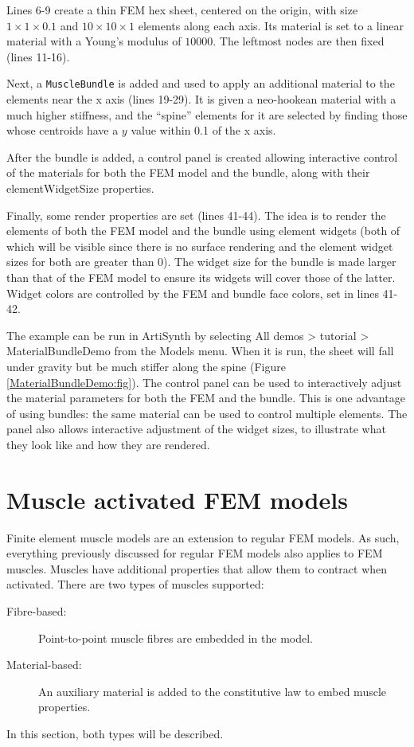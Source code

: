 Lines 6-9 create a thin FEM hex sheet, centered on the origin, with
size $1 \times 1 \times 0.1$ and $10 \times 10 \times 1$ elements
along each axis. Its material is set to a linear material with a
Young's modulus of $10000$. The leftmost nodes are then fixed (lines
11-16).

Next, a {\tt MuscleBundle} is added and used to apply an additional
material to the elements near the x axis (lines 19-29). It is given a
neo-hookean material with a much higher stiffness, and the ``spine''
elements for it are selected by finding those whose centroids 
have a $y$ value within 0.1 of the x axis.

After the bundle is added, a control panel is created allowing
interactive control of the materials for both the FEM model and the
bundle, along with their {\sf elementWidgetSize} properties.

Finally, some render properties are set (lines 41-44). The idea is to
render the elements of both the FEM model and the bundle using element
widgets (both of which will be visible since there is no surface
rendering and the element widget sizes for both are greater than 0).
The widget size for the bundle is made larger than that of the FEM
model to ensure its widgets will cover those of the latter. Widget
colors are controlled by the FEM and bundle face colors, set in lines
41-42.

The example can be run in ArtiSynth by selecting {\sf All demos >
tutorial > MaterialBundleDemo} from the {\sf Models} menu.  When it is
run, the sheet will fall under gravity but be much stiffer along the
spine (Figure \ref{MaterialBundleDemo:fig}). The control panel can be
used to interactively adjust the material parameters for both the FEM
and the bundle. This is one advantage of using bundles: the same
material can be used to control multiple elements. The panel also
allows interactive adjustment of the widget sizes, to illustrate what
they look like and how they are rendered.

\section{Muscle activated FEM models}
\label{sec:fem:muscle}

Finite element muscle models are an extension to regular FEM models.  As such,
everything previously discussed for regular FEM models also applies to FEM
muscles.  Muscles have additional properties that allow them to contract when 
activated.  There are two types of muscles supported:
\begin{description}
\item[Fibre-based:] Point-to-point muscle fibres are embedded in the model.
\item[Material-based:] An auxiliary material is added to the constitutive law
    to embed muscle properties. 
\end{description}
In this section, both types will be described.

